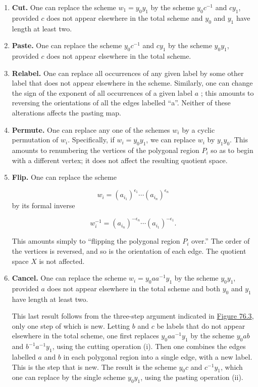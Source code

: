 \begin{enumerate}[itemsep=0.2em, parsep=0pt, topsep=0pt, partopsep=0pt, leftmargin=*, label=(\roman*), align=left]
\item \textbf{Cut.} One can replace the scheme \(w_{1} = y_{0}y_{1}\) by the scheme \(y_{0}c^{-1}\) and \(cy_{1}\), provided \(c\) does not appear elsewhere in the total scheme and \(y_{0}\) and \(y_{1}\) have length at least two.

\item \textbf{Paste.} One can replace the scheme \(y_{0}c^{-1}\) and \(cy_{1}\) by the scheme \(y_{0}y_{1}\), provided \(c\) does not appear elsewhere in the total scheme.

\item \textbf{Relabel.} One can replace all occurrences of any given label by some other label that does not appear elsewhere in the scheme. Similarly, one can change the sign of the exponent of all occurrences of a given label \(a\) ; this amounts to reversing the orientations of all the edges labelled ``a''. Neither of these alterations affects the pasting map.

\item \textbf{Permute.} One can replace any one of the schemes \(w_{i}\) by a cyclic permutation of \(w_{i}\). Specifically, if \(w_{i} = y_{0}y_{1}\), we can replace \(w_{i}\) by \(y_{1}y_{0}\). This amounts to renumbering the vertices of the polygonal region \(P_{i}\) so as to begin with a different vertex; it does not affect the resulting quotient space.

\item \textbf{Flip.} One can replace the scheme

\[
w_{i} = {( a_{i_{1}}) }^{{\epsilon }_{1}}\cdots {( a_{i_{n}}) }^{{\epsilon }_{n}}
\]
by its formal inverse

\[
w_i^{-1} = {( a_{i_{n}}) }^{-{\epsilon }_{n}}\cdots {( a_{i_{1}}) }^{-{\epsilon }_{1}}.
\]

This amounts simply to ``flipping the polygonal region \(P_{i}\) over.'' The order of the vertices is reversed, and so is the orientation of each edge. The quotient space \(X\) is not affected.

\item \textbf{Cancel.} One can replace the scheme \(w_{i} = y_{0}aa^{-1}y_{1}\) by the scheme \(y_{0}y_{1}\), provided \(a\) does not appear elsewhere in the total scheme and both \(y_{0}\) and \(y_{1}\) have length at least two.

This last result follows from the three-step argument indicated in \hyperref[fig:76.3]{Figure 76.3}, only one step of which is new. Letting \(b\) and \(c\) be labels that do not appear elsewhere in the total scheme, one first replaces \(y_{0}aa^{-1}y_{1}\) by the scheme \(y_{0}{ab}\) and \(b^{-1}a^{-1}y_{1}\), using the cutting operation (i). Then one combines the edges labelled \(a\) and \(b\) in each polygonal region into a single edge, with a new label. This is the step that is new. The result is the scheme \(y_{0}c\) and \(c^{-1}y_{1}\), which one can replace by the single scheme \(y_{0}y_{1}\), using the pasting operation (ii).


\end{enumerate}
